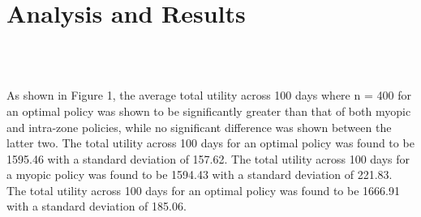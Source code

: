 \documentclass[10pt]{article}
\begin{document}
\section{Analysis and Results}
\\
\begin{figure}[h!]
    \centering
    \qquad
    \caption{}
    \label{}
\end{figure}
\\
As shown in Figure 1, the average total utility across 100 days where n = 400 for an optimal policy was shown to be significantly greater than that of both myopic and intra-zone policies, while no significant difference was shown between the latter two. The total utility across 100 days for an optimal policy was found to be 1595.46 with a standard deviation of 157.62. The total utility across 100 days for a myopic policy was found to be 1594.43 with a standard deviation of 221.83. The total utility across 100 days for an optimal policy was found to be 1666.91 with a standard deviation of 185.06.
\end{document}
